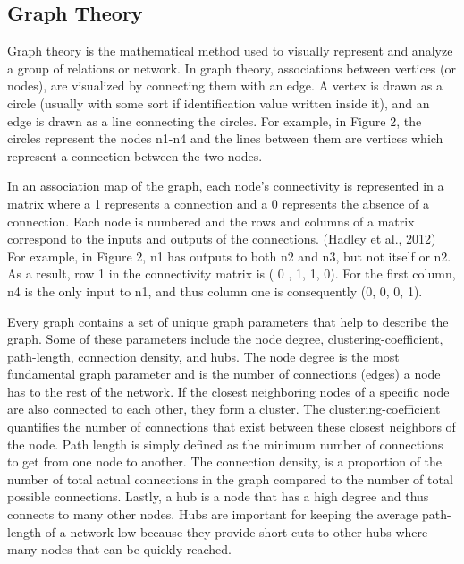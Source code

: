 \documentclass[11pt,letterpaper,doublespacing,titlepage]{article}
\begin{document}
\subsection{Graph Theory}
\par
Graph theory is the mathematical method used to visually represent and analyze a group of relations or network. In graph theory, associations between vertices (or nodes), are visualized by connecting them with an edge. A vertex is drawn as a circle (usually with some sort if identification value written inside it), and an edge is drawn as a line connecting the circles. For example, in Figure 2, the circles represent the nodes n1-n4 and the lines between them are vertices which represent a connection between the two nodes.
\par
In an association map of the graph, each node’s connectivity is represented in a matrix where a 1 represents a connection and a 0 represents the absence of a connection. Each node is numbered and the rows and columns of a matrix correspond to the inputs and outputs of the connections. (Hadley et al., 2012) For example, in Figure 2, n1 has outputs to both n2 and n3, but not itself or n2. As a result, row 1 in the connectivity matrix is ( 0 , 1, 1, 0). For the first column, n4 is the only input to n1, and thus column one is consequently (0, 0, 0, 1). 
\par
Every graph contains a set of unique graph parameters that help to describe the graph. Some of these parameters include the node degree, clustering-coefficient, path-length, connection  density, and hubs. The node degree is the most fundamental graph parameter and is the number of connections (edges)  a node has to the rest of the network. If the closest neighboring nodes of a specific node are also connected to each other, they form a cluster. The clustering-coefficient quantifies the number of connections that exist between these closest neighbors of the node. Path length is simply defined as the minimum number of connections to get from one node to another. The connection density, is a proportion of the number of total actual connections in the graph compared to the number of total possible connections. Lastly, a hub is a node that has a high degree and thus connects to many other nodes. Hubs are important for keeping the average path-length of a network low because they provide short cuts to other hubs where many nodes that can be quickly reached.
\end{document}
